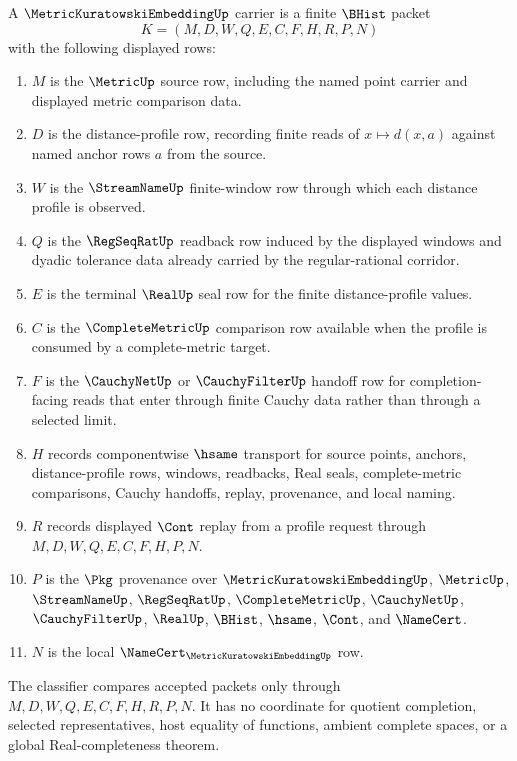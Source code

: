 \begin{definition}
\label{def:metric-kuratowski-embedding-carrier}
A $\MetricKuratowskiEmbeddingUp$ carrier is a finite $\BHist$ packet
$$
K=(M,D,W,Q,E,C,F,H,R,P,N)
$$
with the following displayed rows:
\begin{enumerate}
\item $M$ is the $\MetricUp$ source row, including the named point carrier and displayed metric comparison data.
\item $D$ is the distance-profile row, recording finite reads of $x \mapsto d(x,a)$ against named anchor rows $a$ from the source.
\item $W$ is the $\StreamNameUp$ finite-window row through which each distance profile is observed.
\item $Q$ is the $\RegSeqRatUp$ readback row induced by the displayed windows and dyadic tolerance data already carried by the regular-rational corridor.
\item $E$ is the terminal $\RealUp$ seal row for the finite distance-profile values.
\item $C$ is the $\CompleteMetricUp$ comparison row available when the profile is consumed by a complete-metric target.
\item $F$ is the $\CauchyNetUp$ or $\CauchyFilterUp$ handoff row for completion-facing reads that enter through finite Cauchy data rather than through a selected limit.
\item $H$ records componentwise $\hsame$ transport for source points, anchors, distance-profile rows, windows, readbacks, Real seals, complete-metric comparisons, Cauchy handoffs, replay, provenance, and local naming.
\item $R$ records displayed $\Cont$ replay from a profile request through $M,D,W,Q,E,C,F,H,P,N$.
\item $P$ is the $\Pkg$ provenance over $\MetricKuratowskiEmbeddingUp$, $\MetricUp$, $\StreamNameUp$, $\RegSeqRatUp$, $\CompleteMetricUp$, $\CauchyNetUp$, $\CauchyFilterUp$, $\RealUp$, $\BHist$, $\hsame$, $\Cont$, and $\NameCert$.
\item $N$ is the local $\NameCert_{\MetricKuratowskiEmbeddingUp}$ row.
\end{enumerate}
The classifier compares accepted packets only through $M,D,W,Q,E,C,F,H,R,P,N$. It has no coordinate for quotient completion, selected representatives, host equality of functions, ambient complete spaces, or a global Real-completeness theorem.
\end{definition}

